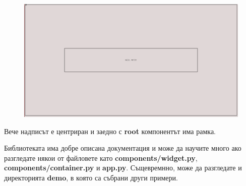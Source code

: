                 \vspace{5mm}
                \begin{figure}[h]
                        \centering
                        \includegraphics[width=150mm]{images/tutorial/hello-world-center.png}
                        \caption{}
                        \label{fig:hello-world-center}
                \end{figure}
                \vspace{5mm}

                Вече надписът е центриран и заедно с \textbf{root} компонентът 
                има рамка.
                \newline


        Библиотеката има добре описана документация и може да научите много ако 
        разгледате някои от файловете като \textbf{components/widget.py}, 
        \textbf{components/container.py} и \textbf{app.py}. Същевремнно, може
        да разгледате и директорията \textbf{demo}, в която са събрани други
        примери.

